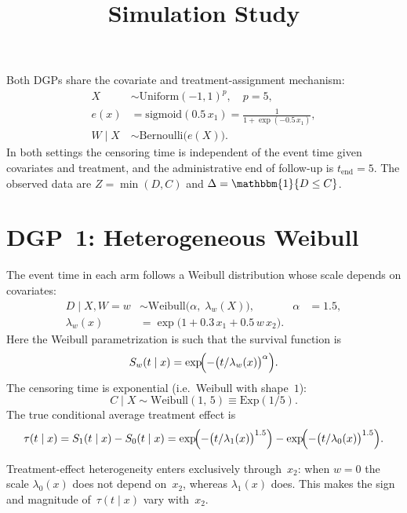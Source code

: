 \documentclass{article}
\title{Simulation Study}
\author{}
\date{}
\DeclareMathOperator{\IDF}{\mathbbm{1}}
\begin{document}
\maketitle

Both DGPs share the covariate and treatment-assignment mechanism:
\begin{align}
  X &\sim \mathrm{Uniform}(-1,1)^p, \quad p=5, \\
  e(x) &= \mathrm{sigmoid}(0.5\, x_1)
         = \frac{1}{1+\exp(-0.5\, x_1)}, \\
  W \mid X &\sim \mathrm{Bernoulli}\bigl(e(X)\bigr).
\end{align}
In both settings the censoring time is independent of the event time given covariates and treatment, and the administrative end of follow-up is $t_{\mathrm{end}}=5$.  The observed data are $Z = \min(D, C)$ and $\Delta = \IDF\{D \le C\}$.

\section*{DGP~1: Heterogeneous Weibull}

The event time in each arm follows a Weibull distribution whose scale depends on covariates:
\begin{align}
  D \mid X, W=w
    &\sim \mathrm{Weibull}\!\bigl(\alpha,\; \lambda_w(X)\bigr),
    &
  \alpha &= 1.5,
  \\
  \lambda_w(x)
    &= \exp\!\bigl(1 + 0.3\, x_1 + 0.5\, w\, x_2\bigr).
\end{align}
Here the Weibull parametrization is such that the survival function is
\[
  S_w(t \mid x)
  = \exp\!\Bigl(-\bigl(t / \lambda_w(x)\bigr)^{\alpha}\Bigr).
\]
The censoring time is exponential (i.e.\ Weibull with shape~$1$):
\[
  C \mid X \sim \mathrm{Weibull}(1,\, 5) \equiv \mathrm{Exp}(1/5).
\]
The true conditional average treatment effect is
\[
  \tau(t \mid x) = S_1(t \mid x) - S_0(t \mid x)
  = \exp\!\Bigl(-\bigl(t / \lambda_1(x)\bigr)^{1.5}\Bigr)
  - \exp\!\Bigl(-\bigl(t / \lambda_0(x)\bigr)^{1.5}\Bigr).
\]

Treatment-effect heterogeneity enters exclusively through~$x_2$: when $w=0$ the scale $\lambda_0(x)$ does not depend on~$x_2$, whereas $\lambda_1(x)$ does.  This makes the sign and magnitude of~$\tau(t\mid x)$ vary with~$x_2$.

\end{document}
